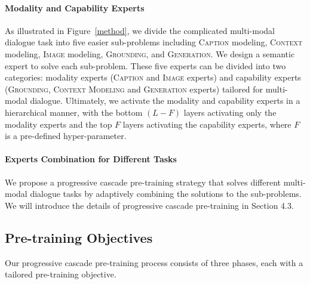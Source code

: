 \documentclass[11pt]{article}
\begin{document}
\paragraph{Modality and Capability Experts}
As illustrated in Figure~\ref{method}, we divide the complicated multi-modal dialogue task into five easier sub-problems including \textsc{Caption} modeling, \textsc{Context} modeling, \textsc{Image} modeling, \textsc{Grounding}, and \textsc{Generation}. We design a semantic expert to solve each sub-problem. These five experts can be divided into two categories: modality experts (\textsc{Caption} and \textsc{Image} experts) and capability experts (\textsc{Grounding}, \textsc{Context Modeling} and \textsc{Generation} experts) tailored for multi-modal dialogue. Ultimately, we activate the modality and capability experts in a hierarchical manner, with the bottom $(L-F)$ layers activating only the modality experts and the top $F$ layers activating the capability experts, where $F$ is a pre-defined hyper-parameter.



\paragraph{Experts Combination for Different Tasks}
We propose a progressive cascade pre-training strategy that solves different multi-modal dialogue tasks by adaptively combining the solutions to the sub-problems. 
We will introduce the details of progressive cascade pre-training in Section 4.3.  

\subsection{Pre-training Objectives}
Our progressive cascade pre-training process consists of three phases, each with a tailored pre-training objective. 
\end{document}
